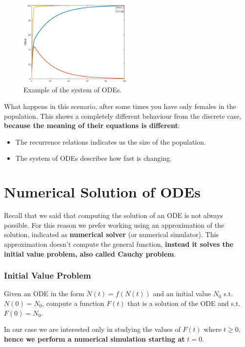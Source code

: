 \begin{figure}[h]
    \centering
    \includegraphics[width=0.5\textwidth]{Images/03 - Contiguous Dynamicsl System/system of ODE.png}
    \caption{Example of the system of ODEs.} 
\end{figure}

What happens in this scenario, after some times you have only females in the population. This shows a completely different behaviour from the discrete case, \textbf{because the meaning of their equations is different}:
\begin{itemize}
    \item The recurrence relations indicates us the size of the population.

    \item The system of ODEs describes how fast is changing.
\end{itemize}

\section{Numerical Solution of ODEs}
Recall that we said that computing the solution of an ODE is not always possible. For this reason we prefer working using an approximation of the solution, indicated as \textbf{numerical solver} (or numerical simulator). This approximation doesn't compute the general function, \textbf{instead it solves the initial value problem, also called Cauchy problem}.

\begin{center}
\subsubsection{Initial Value Problem}
Given an ODE in the form $\dot{N}(t) = f(N(t)) $ and an initial value $N_{0}$ s.t. $N(0) = N_{0}$, compute a function $F(t)$ that is a solution of the ODE and s.t. $F(0) = N_{0}$.
\end{center}

In our case we are interested only in studying the values of $F(t)$ where $t \geq 0$, \textbf{hence we perform a numerical simulation starting at} $t = 0$.

